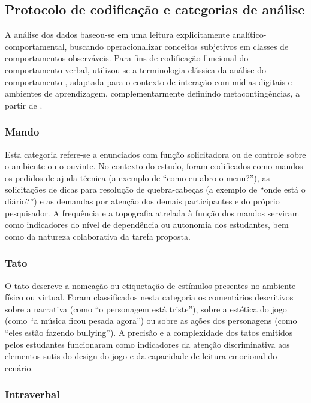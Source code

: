 \documentclass[portuguese]{textolivre}
\begin{document}
\subsection{Protocolo de codificação e categorias de análise}

A análise dos dados baseou-se em uma leitura explicitamente analítico-comportamental, buscando operacionalizar conceitos subjetivos em classes de comportamentos observáveis. Para fins de codificação funcional do comportamento verbal, utilizou-se a terminologia clássica da análise do comportamento \cite{skinner1974behaviorismo,skinner1978comportamentoverbal,baum2019compreender}, adaptada para o contexto de interação com mídias digitais e ambientes de aprendizagem, complementarmente definindo metacontingências, a partir de \textcite{todorov2004analise}.

\subsubsection{Mando}

Esta categoria refere-se a enunciados com função solicitadora ou de controle sobre o ambiente ou o ouvinte. No contexto do estudo, foram codificados como mandos os pedidos de ajuda técnica (a exemplo de “como eu abro o menu?”), as solicitações de dicas para resolução de quebra-cabeças (a exemplo de “onde está o diário?”) e as demandas por atenção dos demais participantes e do próprio pesquisador. A frequência e a topografia atrelada à função dos mandos serviram como indicadores do nível de dependência ou autonomia dos estudantes, bem como da natureza colaborativa da tarefa proposta.

\subsubsection{Tato}

O tato descreve a nomeação ou etiquetação de estímulos presentes no ambiente físico ou virtual. Foram classificados nesta categoria os comentários descritivos sobre a narrativa (como “o personagem está triste”), sobre a estética do jogo (como “a música ficou pesada agora”) ou sobre as ações dos personagens (como “eles estão fazendo bullying”). A precisão e a complexidade dos tatos emitidos pelos estudantes funcionaram como indicadores da atenção discriminativa aos elementos sutis do design do jogo e da capacidade de leitura emocional do cenário.

\subsubsection{Intraverbal}
\end{document}
